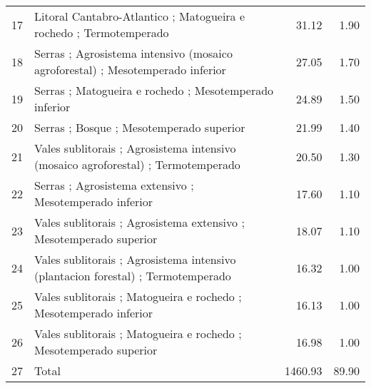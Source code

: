 \begin{table}[p]
\begin{tabular}{rlrr}
  17 & Litoral Cantabro-Atlantico ; Matogueira e rochedo ; Termotemperado & 31.12 & 1.90 \\ 
  18 & Serras ; Agrosistema intensivo (mosaico agroforestal) ; Mesotemperado inferior & 27.05 & 1.70 \\ 
  19 & Serras ; Matogueira e rochedo ; Mesotemperado inferior & 24.89 & 1.50 \\ 
  20 & Serras ; Bosque ; Mesotemperado superior & 21.99 & 1.40 \\ 
  21 & Vales sublitorais ; Agrosistema intensivo (mosaico agroforestal) ; Termotemperado & 20.50 & 1.30 \\ 
  22 & Serras ; Agrosistema extensivo ; Mesotemperado inferior & 17.60 & 1.10 \\ 
  23 & Vales sublitorais ; Agrosistema extensivo ; Mesotemperado superior & 18.07 & 1.10 \\ 
  24 & Vales sublitorais ; Agrosistema intensivo (plantacion forestal) ; Termotemperado & 16.32 & 1.00 \\ 
  25 & Vales sublitorais ; Matogueira e rochedo ; Mesotemperado inferior & 16.13 & 1.00 \\ 
  26 & Vales sublitorais ; Matogueira e rochedo ; Mesotemperado superior & 16.98 & 1.00 \\ 
  27 & Total & 1460.93 & 89.90 \\ 
   \hline
\end{tabular}
\end{table}
